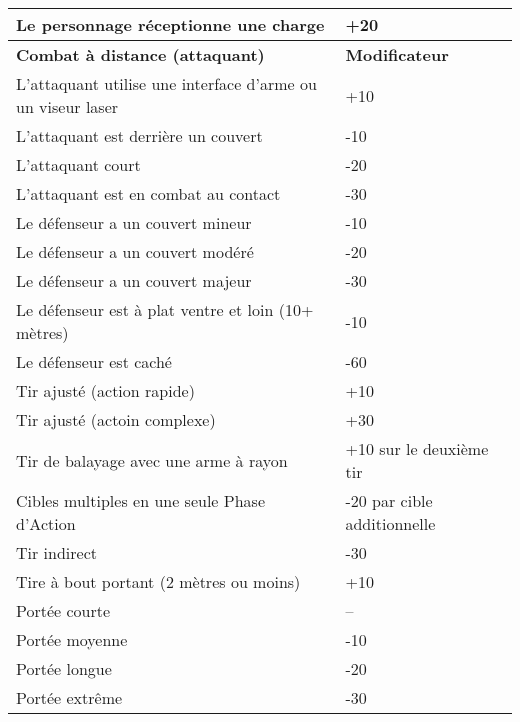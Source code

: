 \begin{table}
\begin{tabularx}{\textwidth}{|X|l|}
Le personnage réceptionne une charge &+20	\\ \hline

\textbf{Combat à distance (attaquant)} &\textbf{Modificateur}	\\ \hline

L'attaquant utilise une interface d'arme ou un viseur laser	&+10	\\ \hline

L'attaquant est derrière un couvert &-10	\\ \hline

L'attaquant court &-20	\\ \hline

L'attaquant est en combat au contact &-30	\\ \hline

Le défenseur a un couvert mineur &-10	\\ \hline

Le défenseur a un couvert modéré &-20	\\ \hline

Le défenseur a un couvert majeur &-30	\\ \hline

Le défenseur est à plat ventre et loin (10+ mètres) &-10	\\ \hline

Le défenseur est caché &-60	\\ \hline

Tir ajusté (action rapide) &+10	\\ \hline

Tir ajusté (actoin complexe) &+30	\\ \hline

Tir de balayage avec une arme à rayon &+10 sur le deuxième tir	\\ \hline

Cibles multiples en une seule Phase d'Action &-20 par cible additionnelle \\ \hline

Tir indirect &-30	\\ \hline

Tire à bout portant (2 mètres ou moins) &+10	\\ \hline

Portée courte &--	\\ \hline

Portée moyenne &-10	\\ \hline

Portée longue &-20	\\ \hline

Portée extrême &-30	\\ \hline

\end{tabularx} \label{tab:combat-modifiers} \end{table} 

